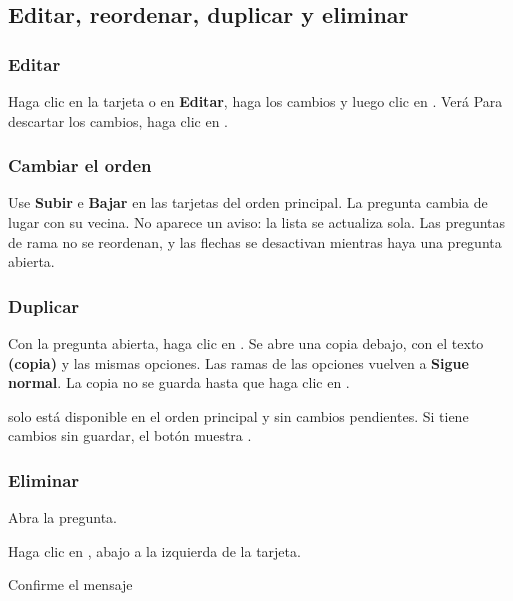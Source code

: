 \subsection{Editar, reordenar, duplicar y eliminar}\label{sec:editar-pregunta}

\subsubsection{Editar}

Haga clic en la tarjeta o en \icono{\icEditar} \textbf{Editar}, haga los cambios y luego clic en
. Verá  Para descartar los
cambios, haga clic en .

\subsubsection{Cambiar el orden}

Use \icono{\icSubir} \textbf{Subir} e \icono{\icBajar} \textbf{Bajar} en las tarjetas del
orden principal. La pregunta cambia de lugar con su vecina. No aparece un aviso: la lista se
actualiza sola. Las preguntas de rama no se reordenan, y las flechas se desactivan mientras
haya una pregunta abierta.

\subsubsection{Duplicar}

Con la pregunta abierta, haga clic en . Se abre una copia
debajo, con el texto \textbf{ (copia)} y las mismas opciones. Las ramas de las
opciones vuelven a \textbf{Sigue normal}. La copia no se guarda hasta que haga clic en
.

\begin{nota}
 solo está disponible en el orden principal y sin cambios pendientes. Si
tiene cambios sin guardar, el botón muestra .
\end{nota}

\subsubsection{Eliminar}

\begin{pasos}
  \item Abra la pregunta.
  \item Haga clic en , abajo a la izquierda de la tarjeta.
  \item Confirme el mensaje 
\end{pasos}

